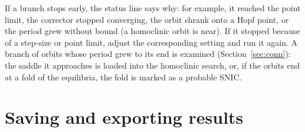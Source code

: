 \documentclass[11pt,a4paper]{article}
\begin{document}
If a branch stops early, the status line says why: for example, it reached the point limit, the corrector stopped converging, the orbit shrank onto a Hopf point, or the period grew without bound (a homoclinic orbit is near). If it stopped because of a step-size or point limit, adjust the corresponding setting and run it again. A branch of orbits whose period grew to its end is examined (Section~\ref{sec:conn}): the saddle it approaches is loaded into the homoclinic search, or, if the orbits end at a fold of the equilibria, the fold is marked as a probable SNIC.

\section{Saving and exporting results}\label{sec:export}
\end{document}
